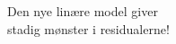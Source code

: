 \documentclass[preview]{standalone}
\begin{document}
\begin{center}
Den nye linære model giver \\ stadig mønster i residualerne!
\end{center}
\end{document}
